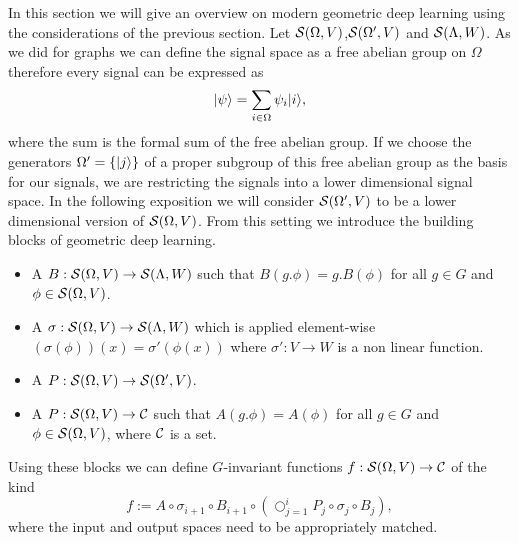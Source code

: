 \documentclass[../3.tex]{subfiles}
\begin{document}
    In this section we will give an overview on modern geometric deep learning using the considerations of the previous section.
    Let $\mathcal{S}(\Omega,V)$,$\mathcal{S}(\Omega',V)$ and $\mathcal{S}(\Lambda,W)$.
    As we did for graphs we can define the signal space as a free abelian group on $\Omega$ therefore every signal can be expressed as 
    \[ | \psi \rangle = \sum_{i \in \Omega} \psi_i| i \rangle, \]
    where the sum is the formal sum of the free abelian group.
    If we choose the generators $\Omega' = \{| j \rangle\}$ of a proper subgroup of this free abelian 
    group as the basis for our signals, we are restricting the signals into a lower dimensional signal space.
    In the following exposition we will consider $\mathcal{S}(\Omega',V)$ to be a lower dimensional version of $\mathcal{S}(\Omega,V)$.
    From this setting we introduce the building blocks of geometric deep learning.

    \begin{itemize}
        \item A  $B : \mathcal{S}(\Omega,V) \to \mathcal{S}(\Lambda,W)$ such that
            $B(g.\phi) = g.B(\phi)$ for all $g \in G$ and $\phi \in \mathcal{S}(\Omega,V)$.
        \item A  $\sigma : \mathcal{S}(\Omega,V) \to \mathcal{S}(\Lambda,W)$ which is applied element-wise 
            $(\sigma(\phi))(x) = \sigma'(\phi(x))$ where $\sigma' : V \to W$ is a non linear function.
        \item A  $P : \mathcal{S}(\Omega,V) \to \mathcal{S}(\Omega',V)$.
        \item A  $P : \mathcal{S}(\Omega,V) \to \mathcal{C}$ such that $A(g.\phi) = A(\phi)$ for all $g \in G$ 
        and $\phi \in \mathcal{S}(\Omega,V)$, where $\mathcal{C}$ is a set.
    \end{itemize}

    Using these blocks we can define $G$-invariant functions $f : \mathcal{S}(\Omega,V) \to \mathcal{C}$ of the kind
    \[ f := A \circ \sigma_{i+1} \circ B_{i+1} \circ (\bigcirc_{j = 1}^i P_j \circ \sigma_j \circ B_j ) , \]
    where the input and output spaces need to be appropriately matched.

\end{document}
